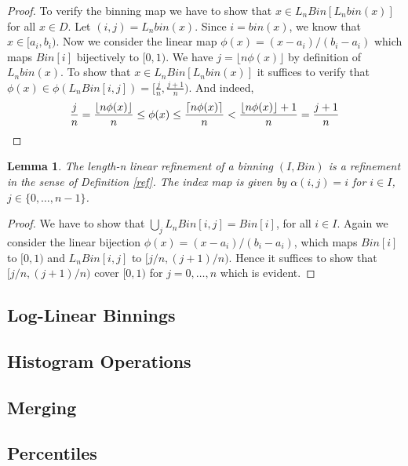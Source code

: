 \documentclass{article}
\DeclarePairedDelimiter{\ceil}{\lceil}{\rceil}
\theoremstyle{plain}
\newtheorem{lemma}[definition]{Lemma}
\theoremstyle{remark}
\newcommand{\Union}{\bigcup}
\newcommand{\floor}[1]{\lfloor#1\rfloor}
\begin{document}
\begin{proof}
  To verify the binning map we have to show that $x \in L_nBin[ L_nbin(x) ]$ for all $x \in D$.
  Let $(i,j) = L_nbin(x)$.
  Since $i = bin(x)$, we know that $x \in [a_i, b_i)$.
  Now we consider the linear map $\phi(x) = (x-a_i)/(b_i-a_i)$ which maps $Bin[i]$ bijectively to $[0,1)$.
  We have $j = \floor{ n \phi(x) }$ by definition of $L_nbin(x)$.
  To show that $x \in L_nBin[ L_nbin(x) ]$ it suffices to verify
  that $\phi(x) \in \phi(L_nBin[i,j]) = [ \frac{j}{n}, \frac{j+1}{n} )$.
  And indeed,
  \begin{align*}
    \frac{j}{n} = \frac{\floor{ n \phi(x) }}{n} \leq \phi(x)
    \leq \frac{\ceil{n \phi(x)}}{n} < \frac{\floor{ n \phi(x) } + 1 }{n} =  \frac{j+1}{n}
  \end{align*}
\end{proof}

\begin{lemma}
  The length-n linear refinement of a binning $(I, Bin)$ is a refinement in the sense of Definition \ref{ref}.
  The index map is given by $\alpha(i,j) = i$ for $i \in I$, $j \in \{0,\dots,n-1\}$.
\end{lemma}

\begin{proof}
  We have to show that $\Union_{j} L_nBin[i,j] = Bin[i]$, for all $i \in I$.
  Again we consider the linear bijection $\phi(x) = (x-a_i)/(b_i-a_i)$, which maps $Bin[i]$ to $[0,1)$ and $L_nBin[i,j]$ to $[j/n, (j+1)/n)$.
  Hence it suffices to show that $[j/n, (j+1)/n)$ cover $[0,1)$ for $j=0,\dots,n$ which is evident.
\end{proof}

\subsection{Log-Linear Binnings}

\subsection{Histogram Operations}

\subsection{Merging}

\subsection{Percentiles}
\end{document}
